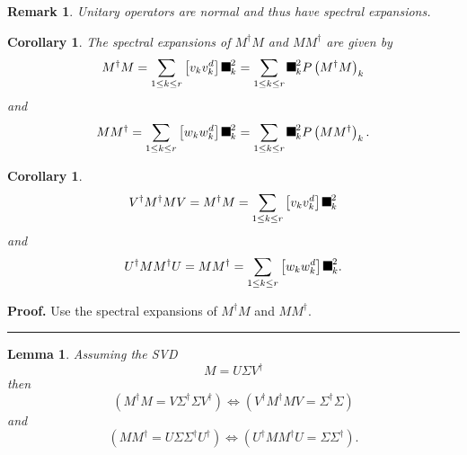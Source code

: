 \documentclass[aps,preprint]{revtex4}%
\providecommand{\U}[1]{\protect\rule{.1in}{.1in}}
\newtheorem{corollary}[theorem]{Corollary}
\newtheorem{lemma}[theorem]{Lemma}
\newtheorem{remark}[theorem]{Remark}
\newenvironment{proof}[1][Proof]{\noindent\textbf{#1.} }{\ \rule{0.5em}{0.5em}}
\begin{document}
\begin{remark}
Unitary operators are normal and thus have spectral expansions.
\end{remark}

\begin{corollary}
The \emph{spectral expansions} of $M^{\dagger}M$ and $MM^{\dagger}$ are given
by
\begin{equation}
M^{\dagger}M=\sum_{1\leq k\leq r}\left[  v_{k}v_{k}^{d}\right]  \U{3c3}
_{k}^{2}=\sum_{1\leq k\leq r}\U{3c3} _{k}^{2}P\left(  M^{\dagger}M\right)
_{k}%
\end{equation}
and
\begin{equation}
MM^{\dagger}=\sum_{1\leq k\leq r}\left[  w_{k}w_{k}^{d}\right]  \U{3c3}
_{k}^{2}=\sum_{1\leq k\leq r}\U{3c3} _{k}^{2}P\left(  MM^{\dagger}\right)
_{k}.
\end{equation}

\end{corollary}

\begin{corollary}%
\begin{equation}
V^{\dagger}M^{\dagger}MV=M^{\dagger}M=\sum_{1\leq k\leq r}\left[  v_{k}%
v_{k}^{d}\right]  \U{3c3} _{k}^{2}%
\end{equation}
and%
\begin{equation}
U^{\dagger}MM^{\dagger}U=MM^{\dagger}=\sum_{1\leq k\leq r}\left[  w_{k}%
w_{k}^{d}\right]  \U{3c3} _{k}^{2}.
\end{equation}

\end{corollary}

\begin{proof}
Use the spectral expansions of $M^{\dagger}M$ and $MM^{\dagger}.$
\end{proof}

\begin{lemma}
Assuming the SVD
\begin{equation}
M=U\Sigma V^{\dagger}%
\end{equation}
then
\begin{equation}
\left(  M^{\dagger}M=V\Sigma^{\dagger}\Sigma V^{\dagger}\right)
\Longleftrightarrow\left(  V^{\dagger}M^{\dagger}MV=\Sigma^{\dagger}%
\Sigma\right)
\end{equation}
and
\begin{equation}
\left(  MM^{\dagger}=U\Sigma\Sigma^{\dagger}U^{\dagger}\right)
\Longleftrightarrow\left(  U^{\dagger}MM^{\dagger}U=\Sigma\Sigma^{\dagger
}\right)  .
\end{equation}

\end{lemma}
\end{document}
